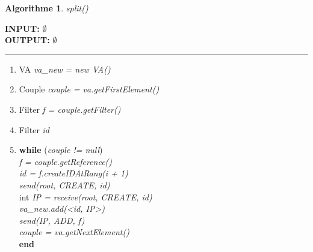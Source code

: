 \documentclass[a4paper,11pt]{report}
\begin{document}
\newtheorem{algorithme}{Algorithme}
\begin{algorithme}
	split()
\end{algorithme}

\begin{flushleft}
	\begin{framed}
		\textbf{INPUT:} $\emptyset$\\
		\textbf{OUTPUT:} $\emptyset$
		\noindent\rule{\linewidth}{0.5pt}

		\begin{enumerate}
			\item VA \textit{va\_new = new VA()}
			\item Couple \textit{couple = va.getFirstElement()}
			\item Filter \textit{f = couple.getFilter()}
			\item Filter \textit{id}
			\item 
		\begin{tabbing}
			\textbf{while} (\= \textit{couple != null})\\
					\> \textit{f = couple.getReference()}\\
					\> \textit{id = f.createIDAtRang(i + 1)}\\
					\> \textit{send(root, CREATE, id)}\\
					\> int \textit{IP = receive(root, CREATE, id)}\\
					\> \textit{va\_new.add(<id, IP>)}\\
					\> \textit{send(IP, ADD, f)}\\
					\> \textit{couple = va.getNextElement()}\\
			\textbf{end}\\
	    \end{tabbing}
		\end{enumerate}
	\end{framed}
\end{flushleft}
\end{document}
